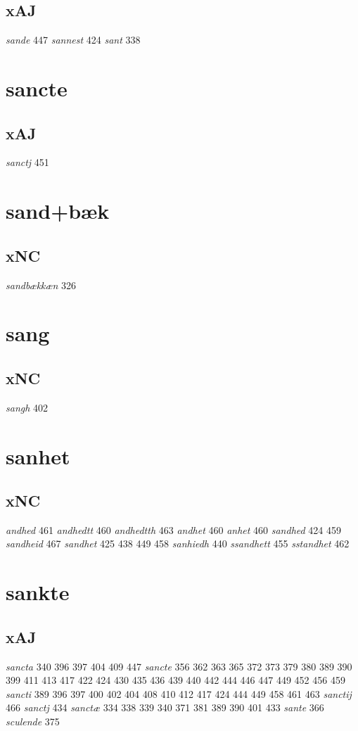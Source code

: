 \documentclass[a4paper,twocolumn]{article}
\begin{document}
\subsection{xAJ}
\label{sec:orga2e8469}
\emph{sande} 447 \emph{sannest} 424 \emph{sant} 338 
\section{sancte}
\label{sec:org75ae697}
\subsection{xAJ}
\label{sec:org1eb1e48}
\emph{sanctj} 451 
\section{sand+bæk}
\label{sec:org76c4a85}
\subsection{xNC}
\label{sec:org8560938}
\emph{sandbækkæn} 326 
\section{sang}
\label{sec:orge996cdf}
\subsection{xNC}
\label{sec:org022044b}
\emph{sangh} 402 
\section{sanhet}
\label{sec:org7fab926}
\subsection{xNC}
\label{sec:org2fb16b1}
\emph{andhed} 461 \emph{andhedtt} 460 \emph{andhedtth} 463 \emph{andhet} 460 \emph{anhet} 460 \emph{sandhed} 424 459 \emph{sandheid} 467 \emph{sandhet} 425 438 449 458 \emph{sanhiedh} 440 \emph{ssandhett} 455 \emph{sstandhet} 462 
\section{sankte}
\label{sec:org8496ad8}
\subsection{xAJ}
\label{sec:org23cfbec}
\emph{sancta} 340 396 397 404 409 447 \emph{sancte} 356 362 363 365 372 373 379 380 389 390 399 411 413 417 422 424 430 435 436 439 440 442 444 446 447 449 452 456 459 \emph{sancti} 389 396 397 400 402 404 408 410 412 417 424 444 449 458 461 463 \emph{sanctij} 466 \emph{sanctj} 434 \emph{sanctæ} 334 338 339 340 371 381 389 390 401 433 \emph{sante} 366 \emph{sculende} 375 
\end{document}
